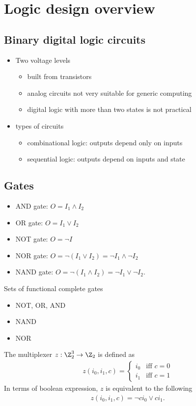 \documentclass{article}
\begin{document}
\section{Logic design overview}
\subsection{Binary digital logic circuits}
\begin{itemize}
	\item Two voltage levels \begin{itemize}
		      \item built from transistors
		      \item analog circuits not very suitable for generic computing
		      \item digital logic with more than two states is not practical
	      \end{itemize}
	\item types of circuits \begin{itemize}
		      \item combinational logic: outputs depend only on inputs
		      \item sequential logic: outputs depend on inputs and state
	      \end{itemize}
\end{itemize}
\subsection{Gates}
\begin{itemize}
	\item AND gate: $O = I_1 \wedge I_2$
	\item OR gate: $O = I_1 \vee I_2$
	\item NOT gate: $O = \neg I$
	\item NOR gate: $O = \neg(I_1 \vee I_2) = \neg I_1 \wedge \neg I_2$
	\item NAND gate: $O = \neg(I_1 \wedge I_2) = \neg I_1 \vee \neg I_2$.
\end{itemize}
Sets of functional complete gates
\begin{itemize}
	\item NOT, OR, AND
	\item NAND
	\item NOR
\end{itemize}
\begin{definition}
	The multiplexer $z:\Z_2^3\to\Z_2$ is defined as
	\begin{align*}
		z(i_0,i_1,c) = \begin{cases}
			               i_0 & \text{iff }c=0 \\
			               i_1 & \text{iff }c=1
		               \end{cases}
	\end{align*}
	In terms of boolean expression, $z$ is equivalent to the following
	\begin{align*}
		z(i_0,i_1,c) = \neg c i_0 \vee ci_1.
	\end{align*}
\end{definition}
\end{document}
